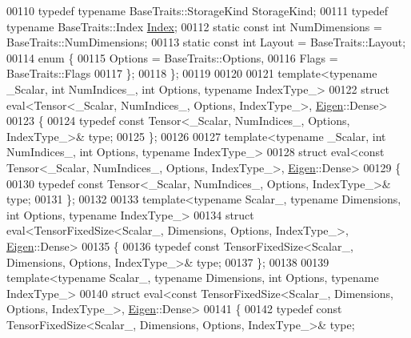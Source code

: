 \begin{DoxyCode}
00110   \textcolor{keyword}{typedef} \textcolor{keyword}{typename} BaseTraits::StorageKind StorageKind;
00111   \textcolor{keyword}{typedef} \textcolor{keyword}{typename} BaseTraits::Index \hyperlink{namespace_eigen_a62e77e0933482dafde8fe197d9a2cfde}{Index};
00112   \textcolor{keyword}{static} \textcolor{keyword}{const} \textcolor{keywordtype}{int} NumDimensions = BaseTraits::NumDimensions;
00113   \textcolor{keyword}{static} \textcolor{keyword}{const} \textcolor{keywordtype}{int} Layout = BaseTraits::Layout;
00114   \textcolor{keyword}{enum} \{
00115     Options = BaseTraits::Options,
00116     Flags = BaseTraits::Flags
00117   \};
00118 \};
00119 
00120 
00121 \textcolor{keyword}{template}<\textcolor{keyword}{typename} \_Scalar, \textcolor{keywordtype}{int} NumIndices\_, \textcolor{keywordtype}{int} Options, \textcolor{keyword}{typename} IndexType\_>
00122 \textcolor{keyword}{struct }eval<Tensor<\_Scalar, NumIndices\_, Options, IndexType\_>, \hyperlink{namespace_eigen}{Eigen}::Dense>
00123 \{
00124   \textcolor{keyword}{typedef} \textcolor{keyword}{const} Tensor<\_Scalar, NumIndices\_, Options, IndexType\_>& type;
00125 \};
00126 
00127 \textcolor{keyword}{template}<\textcolor{keyword}{typename} \_Scalar, \textcolor{keywordtype}{int} NumIndices\_, \textcolor{keywordtype}{int} Options, \textcolor{keyword}{typename} IndexType\_>
00128 \textcolor{keyword}{struct }eval<const Tensor<\_Scalar, NumIndices\_, Options, IndexType\_>, \hyperlink{namespace_eigen}{Eigen}::Dense>
00129 \{
00130   \textcolor{keyword}{typedef} \textcolor{keyword}{const} Tensor<\_Scalar, NumIndices\_, Options, IndexType\_>& type;
00131 \};
00132 
00133 \textcolor{keyword}{template}<\textcolor{keyword}{typename} Scalar\_, \textcolor{keyword}{typename} Dimensions, \textcolor{keywordtype}{int} Options, \textcolor{keyword}{typename} IndexType\_>
00134 \textcolor{keyword}{struct }eval<TensorFixedSize<Scalar\_, Dimensions, Options, IndexType\_>, \hyperlink{namespace_eigen}{Eigen}::Dense>
00135 \{
00136   \textcolor{keyword}{typedef} \textcolor{keyword}{const} TensorFixedSize<Scalar\_, Dimensions, Options, IndexType\_>& type;
00137 \};
00138 
00139 \textcolor{keyword}{template}<\textcolor{keyword}{typename} Scalar\_, \textcolor{keyword}{typename} Dimensions, \textcolor{keywordtype}{int} Options, \textcolor{keyword}{typename} IndexType\_>
00140 \textcolor{keyword}{struct }eval<const TensorFixedSize<Scalar\_, Dimensions, Options, IndexType\_>, 
      \hyperlink{namespace_eigen}{Eigen}::Dense>
00141 \{
00142   \textcolor{keyword}{typedef} \textcolor{keyword}{const} TensorFixedSize<Scalar\_, Dimensions, Options, IndexType\_>& type;

\end{DoxyCode}
